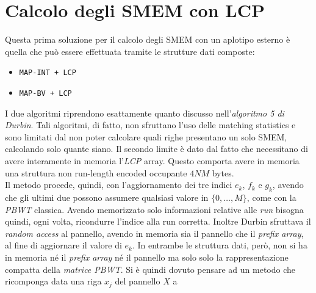 \section{Calcolo degli SMEM con LCP}
Questa prima soluzione per il calcolo degli SMEM con un aplotipo esterno è
quella che può essere effettuata tramite le strutture dati composte:
\begin{itemize}
  \item \texttt{MAP-INT + LCP}
  \item \texttt{MAP-BV + LCP}
\end{itemize}
I due algoritmi riprendono esattamente quanto discusso nell'\textit{algoritmo 5
  di Durbin}. Tali algoritmi, di 
fatto, non sfruttano l'uso delle matching statistics e sono limitati dal non
poter calcolare quali righe presentano un solo SMEM, calcolando solo quante
siano. Il secondo limite è dato dal fatto che necessitano di avere interamente
in memoria l'\textit{LCP} array. Questo comporta avere in memoria una
struttura non run-length encoded occupante $4NM$ bytes.\\
Il metodo procede, quindi, con l'aggiornamento dei tre indici $e_k$, $f_k$ e
$g_k$, avendo che gli ultimi due possono assumere qualsiasi valore in
$\{0,\ldots, M\}$,
come con la \textit{PBWT} classica. Avendo memorizzato solo informazioni
relative alle \textit{run} bisogna quindi, ogni volta, ricondurre l'indice alla
run corretta.
Inoltre Durbin sfruttava il \textit{random access} al pannello, avendo in
memoria sia il pannello che il \textit{prefix array}, al fine di aggiornare il
valore di $e_k$. In entrambe le struttura dati, però,
non si ha in memoria né il \textit{prefix array} né il pannello ma solo solo la
rappresentazione compatta della \textit{matrice PBWT}. Si è quindi dovuto
pensare ad un metodo che ricomponga data una riga $x_j$ del pannello $X$ a
